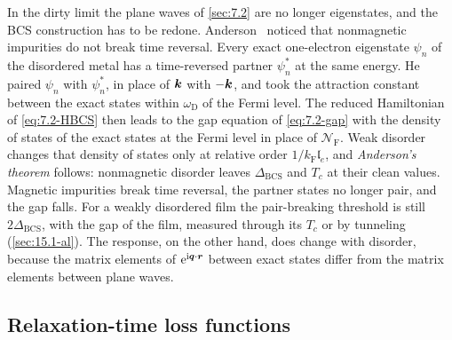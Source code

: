 In the dirty limit the plane waves of \cref{sec:7.2} are no longer eigenstates, and the BCS construction has to be redone. Anderson~\cite{anderson1959theory} noticed that nonmagnetic impurities do not break time reversal. Every exact one-electron eigenstate $\psi_n$ of the disordered metal has a time-reversed partner $\psi_n^*$ at the same energy. He paired $\psi_n$ with $\psi_n^*$, in place of $\bm{k}$ with $-\bm{k}$, and took the attraction constant between the exact states within $\omega_{\mathrm{D}}$ of the Fermi level. The reduced Hamiltonian of \cref{eq:7.2-HBCS} then leads to the gap equation of \cref{eq:7.2-gap} with the density of states of the exact states at the Fermi level in place of $\mathcal{N}_{\mathrm{F}}$. Weak disorder changes that density of states only at relative order $1/k_{\mathrm{F}}\mathfrak{l}_e$, and \emph{Anderson's theorem} follows: nonmagnetic disorder leaves $\Delta_{\mathrm{BCS}}$ and $T_c$ at their clean values. Magnetic impurities break time reversal, the partner states no longer pair, and the gap falls. For a weakly disordered film the pair-breaking threshold is still $2\Delta_{\mathrm{BCS}}$, with the gap of the film, measured through its $T_c$ or by tunneling (\cref{sec:15.1-al}). The response, on the other hand, does change with disorder, because the matrix elements of $\mathrm{e}^{\mathrm{i}\bm{q}\cdot\bm{r}}$ between exact states differ from the matrix elements between plane waves.

\subsection{Relaxation-time loss functions}\label{sec:15.3-mermin}

